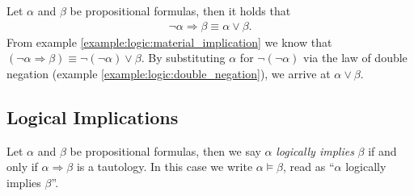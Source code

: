 \begin{examples}
\begin{exampleenumerate}
        \item\label{example:logic:demorgan_implication} Let $\alpha$ and $\beta$ be propositional formulas, then it holds that
        \begin{align}\lnot\alpha\Rightarrow\beta \equiv \alpha\lor\beta.\end{align}
        From example \ref{example:logic:material_implication} we know that $(\lnot\alpha\Rightarrow\beta)\equiv \lnot(\lnot\alpha)\lor\beta$. By substituting $\alpha$ for $\lnot(\lnot\alpha)$ via the law of double negation (example \ref{example:logic:double_negation}), we arrive at $\alpha\lor\beta$.
    \end{exampleenumerate}
\end{examples}

\subsection{Logical Implications}

\begin{definition}
    Let $\alpha$ and $\beta$ be propositional formulas, then we say $\alpha$ \emph{logically implies} $\beta$ if and only if $\alpha\Rightarrow\beta$ is a tautology. In this case we write $\alpha\vDash\beta$, read as \enquote{$\alpha$ logically implies $\beta$}.
\end{definition}

